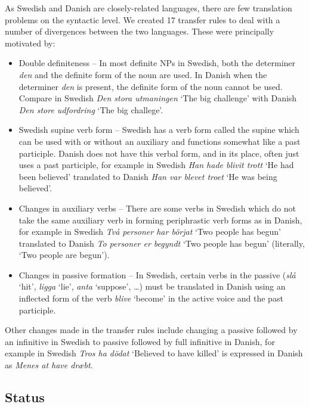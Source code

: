 \documentclass[11pt]{article}
\begin{document}
As Swedish and Danish are closely-related languages, there are few translation problems
on the syntactic level. We created 17 transfer rules to deal with a number of divergences 
between the two languages. These were principally motivated by:

\begin{itemize}
  \item  Double definiteness -- In most definite NPs in Swedish, both the determiner \emph{den}
    and the definite form of the noun are used. In Danish when the determiner \emph{den} is 
    present, the definite form of the noun cannot be used. Compare in Swedish \emph{Den stora utmaningen}
    `The big challenge' with Danish \emph{Den store udfordring} `The big challege'.
  \item  Swedish supine verb form -- Swedish has a verb form called the supine which can be used with
    or without an auxiliary and functions somewhat like a past participle. Danish does not have this 
    verbal form, and in its place, often just uses a past participle, for example in Swedish 
    \emph{Han hade blivit trott} `He had been believed' translated to Danish \emph{Han var blevet troet} 
    `He was being believed'.
  \item  Changes in auxiliary verbs -- There are some verbs in Swedish which do not take the same 
    auxiliary verb in forming periphrastic verb forms as in Danish, for example in Swedish \emph{Två 
    personer har börjat} `Two people has begun' translated to Danish \emph{To personer er begyndt} 
    `Two people has begun' (literally, `Two people are begun').
  \item  Changes in passive formation -- In Swedish, certain verbs in the passive (\emph{slå} `hit', 
    \emph{ligga} `lie', \emph{anta} `suppose', \ldots) must be translated in Danish using an inflected 
    form of the verb \emph{blive} `become' in the active voice and the past participle.
\end{itemize}

Other changes made in the transfer rules include changing a passive followed by an infinitive in Swedish
to passive followed by full infinitive in Danish, for example in Swedish \emph{Tros ha dödat} `Believed to have killed' is expressed in Danish as \emph{Menes at have dræbt}.

\subsection{Status}
\end{document}
